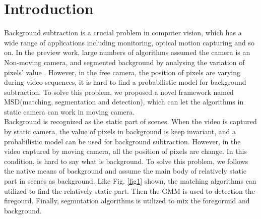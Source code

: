 \documentclass[journal]{IEEEtran}
\newcommand{\reffig}[1]{Fig. \ref{#1}}
\begin{document}
\section{Introduction}
\indent Background subtraction is a crucial problem in computer
vision, which has a wide range of applications including monitoring,
optical motion capturing and so on\cite{Han2012}. In the preview work, 
large numbers of algorithms assumed the camera is an Non-moving camera,
and segmented background by analysing the variation of pixels' value
\cite{Bouwmans2014}. However, in the free camera, the position of pixels
are varying during video sequences, it is hard to find a probabilistic
model for background subtraction.  To solve this problem, we proposed a 
novel framework named MSD(matching, segmentation and detection), which 
can let the algorithms in static camera can work in moving camera.\\
\indent Background is recognized as the static part of scenes. When
the video is captured by static camera, the value of pixels in background
is keep invariant, and a probabilistic model can be used for background
subtraction. However, in the video captured by moving camera, all the
position of pixels are change. In this condition, is hard to say what 
is background. To solve this problem, we follows the native means of
background and assume the main body of relatively static part in
scenes as background. Like \reffig{fig1} shown, the matching algorithms
can utilized to find the relatively static part. Then the GMM is used to 
detection the firegourd. Finally, segmntation algorithms is utilized to
mix the foregorund and background. \\

\label{fig1}
\end{document}
